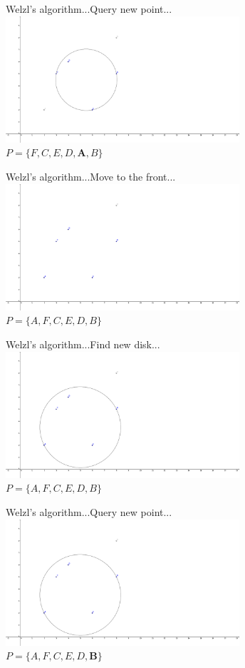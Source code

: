 \documentclass{beamer}
\begin{document}
\begin{frame}{Welzl's algorithm...}{Query new point...}
    \centering
    \includegraphics[trim=0 0 7cm 0,clip,width=0.65\textwidth]{figures/SEC07} \\
    $P = \{F, C, E, D, \mathbf{A}, B\}$
\end{frame}
\begin{frame}{Welzl's algorithm...}{Move to the front...}
    \centering
    \includegraphics[trim=0 0 7cm 0,clip,width=0.65\textwidth]{figures/SEC08} \\
    $P = \{A, F, C, E, D, B\}$
\end{frame}
\begin{frame}{Welzl's algorithm...}{Find new disk...}
    \centering
    \includegraphics[trim=0 0 7cm 0,clip,width=0.65\textwidth]{figures/SEC09} \\
    $P = \{A, F, C, E, D, B\}$
\end{frame}
\begin{frame}{Welzl's algorithm...}{Query new point...}
    \centering
    \includegraphics[trim=0 0 7cm 0,clip,width=0.65\textwidth]{figures/SEC09} \\
    $P = \{A, F, C, E, D, \mathbf{B}\}$
\end{frame}
\end{document}
